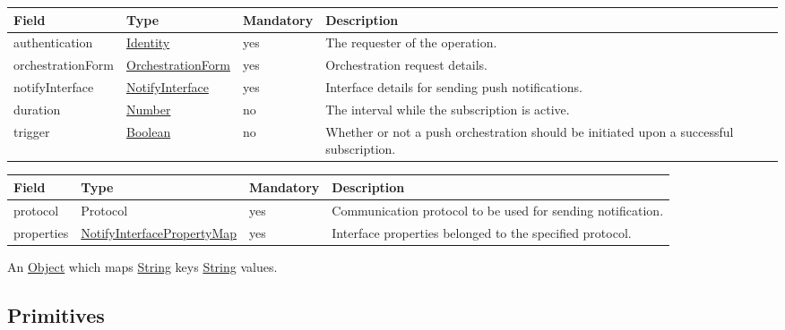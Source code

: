 \documentclass[a4paper]{arrowhead}
\newcommand{\pdef}[1]{{\textcolor{ArrowheadGrey}{#1\label{sec:model:primitives:#1}\label{sec:model:primitives:#1s}\label{sec:model:primitives:#1es}}}}
\newcommand{\pref}[1]{{\textcolor{ArrowheadGrey}{\hyperref[sec:model:primitives:#1]{#1}}}}
\begin{document}
\clearpage


\begin{table}[ht!]
\begin{tabularx}{\textwidth}{| p{3.2cm} | p{3.5cm} | p{2cm} | X |} \hline
\rowcolor{gray!33} Field & Type & Mandatory & Description \\ \hline
authentication & \hyperref[sec:model:Identity]{Identity} & yes & The requester of the operation. \\ \hline
orchestrationForm & \hyperref[sec:model:OrchestrationForm]{OrchestrationForm} & yes & Orchestration request details. \\ \hline
notifyInterface & \hyperref[sec:model:NotifyInterface]{NotifyInterface} & yes & Interface details for sending push notifications. \\ \hline
duration & \pref{Number} & no & The interval while the subscription is active.  \\ \hline
trigger & \pref{Boolean} & no & Whether or not a push orchestration should be initiated upon a successful subscription.  \\ \hline
\end{tabularx}
\end{table}


\begin{table}[ht!]
\begin{tabularx}{\textwidth}{| p{3.2cm} | p{4.3cm} | p{2cm} | X |} \hline
\rowcolor{gray!33} Field & Type & Mandatory & Description \\ \hline
protocol & \pdef{Protocol} & yes & Communication protocol to be used for sending notification. \\ \hline
properties & \hyperref[sec:model:NotifyInterfacePropertyMap]{NotifyInterfacePropertyMap} & yes & Interface properties belonged to the specified protocol. \\ \hline
\end{tabularx}
\end{table}


An \pref{Object} which maps \pref{String} keys \pref{String} values. 

\clearpage

\subsection{Primitives}
\label{sec:model:primitives}
\end{document}
